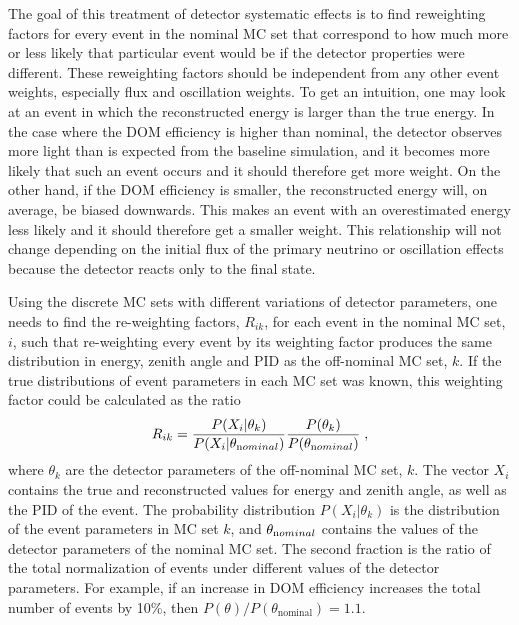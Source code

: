 The goal of this treatment of detector systematic effects is to find reweighting factors for every event in the nominal MC set that correspond to how much more or less likely that particular event would be if the detector properties were different. These reweighting factors should be independent from any other event weights, especially flux and oscillation weights. To get an intuition, one may look at an event in which the reconstructed energy is larger than the true energy. In the case where the DOM efficiency is higher than nominal, the detector observes more light than is expected from the baseline simulation, and it becomes more likely that such an event occurs and it should therefore get more weight. On the other hand, if the DOM efficiency is smaller, the reconstructed energy will, on average, be biased downwards. This makes an event with an overestimated energy less likely and it should therefore get a smaller weight. This relationship will not change depending on the initial flux of the primary neutrino or oscillation effects because the detector reacts only to the final state.

Using the discrete MC sets with different variations of detector parameters, one needs to find the re-weighting factors, $R_{ik}$, for each event in the nominal MC set, $i$, such that re-weighting every event by its weighting factor produces the same distribution in energy, zenith angle and PID as the off-nominal MC set, $k$. If the true distributions of event parameters in each MC set was known, this weighting factor could be calculated as the ratio
\begin{equation}
    R_{ik} = \frac{P(X_i|\theta_k)}{P(X_i|\theta_{\rm nominal})} \frac{P(\theta_k)}{P(\theta_{\rm nominal})}\;, \label{eq:ratio-likelihood}
\end{equation}
where $\theta_k$ are the detector parameters of the off-nominal MC set, $k$. The vector $X_i$ contains the true and reconstructed values for energy and zenith angle, as well as the PID of the event.  The probability distribution $P(X_i|\theta_k)$ is the distribution of the event parameters in MC set $k$, and $\theta_{\rm nominal}$ contains the values of the detector parameters of the nominal MC set. The second fraction is the ratio of the total normalization of events under different values of the detector parameters. For example, if an increase in DOM efficiency increases the total number of events by 10\%, then $P(\theta) / P(\theta_\mathrm{nominal}) = 1.1$.

